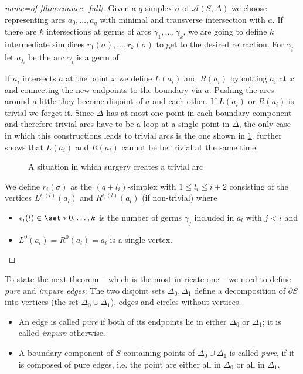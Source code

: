 \begin{proof}[{name={of \autoref{thm:connec_full}}}]
	Given a $q$-simplex $\sigma$ of $\mathcal{A}(S,\Delta)$ we choose representing arcs $a_0, \ldots ,a_q$ with minimal and transverse intersection with $a$.
	If there are $k$ intersections at germs of arcs $\gamma_1, \ldots ,\gamma_k$, we are going to define $k$ intermediate simplices $r_1(\sigma), \ldots ,r_k(\sigma)$ to get to the desired retraction.
	For $\gamma_i$ let $a_{j_i}$ be the arc $\gamma_i$ is a germ of.

	If $a_i$ intersects $a$ at the point $x$ we define $L(a_i)$ and $R(a_i)$ by cutting $a_i$ at $x$ and connecting the new endpoints to the boundary via $a$.
	Pushing the arcs around a little they become disjoint of $a$ and each other.
	If $L(a_i)$ or $R(a_i)$ is trivial we forget it.
	Since $\Delta$ has at most one point in each boundary component and therefore trivial arcs have to be a loop at a single point in $\Delta$, the only case in which this constructions leads to trivial arcs is the one shown in \cref{fig:surg_trivial}.
	 further shows that $L(a_i)$ and $R(a_i)$ cannot be be trivial at the same time.
	\begin{figure}[hbt]
		\centering
		\caption{A situation in which surgery creates a trivial arc}\label{fig:surg_trivial}
	\end{figure}
	
	We define $r_i(\sigma)$ as the $(q+ l_i)$-simplex with $1 \le l_i \le i + 2$ consisting of the vertices $L^{\epsilon_i(l)}(a_l)$ and $R^{\epsilon_i(l)}(a_l)$ (if non-trivial)  where 
	\begin{itemize}
		\item $\epsilon_i(l) \in \set*{0, \ldots ,k}$ is the number of germs $\gamma_j$ included in $a_l$ with $j < i$ and
		\item $L^0(a_l)=R^0(a_l)=a_l$ is a single vertex.
	\end{itemize}
\end{proof}

To state the next theorem -- which is the most intricate one -- we need to define \emph{pure} and \emph{impure edges}:
The two disjoint sets $\Delta_0, \Delta_1$ define a decomposition of $\partial S$ into vertices (the set $\Delta_0 \cup \Delta_1$), edges and circles without vertices.
\begin{itemize}
	\item An edge is called \emph{pure} if both of its endpoints lie in either $\Delta_0$ or $\Delta_1$; it is called \emph{impure} otherwise.
	\item A boundary component of $S$ containing points of $\Delta_0 \cup \Delta_1$ is called \emph{pure}, if it is composed of pure edges, i.e. the point are either all in $\Delta_0$ or all in $\Delta_1$.
\end{itemize}


